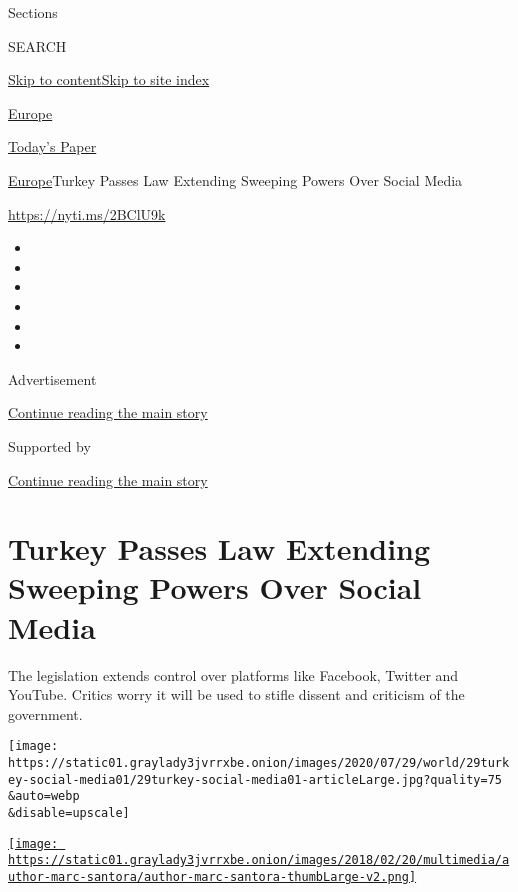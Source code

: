 Sections

SEARCH

\protect\hyperlink{site-content}{Skip to
content}\protect\hyperlink{site-index}{Skip to site index}

\href{https://www.nytimes3xbfgragh.onion/section/world/europe}{Europe}

\href{https://myaccount.nytimes3xbfgragh.onion/auth/login?response_type=cookie\&client_id=vi}{}

\href{https://www.nytimes3xbfgragh.onion/section/todayspaper}{Today's
Paper}

\href{/section/world/europe}{Europe}\textbar{}Turkey Passes Law
Extending Sweeping Powers Over Social Media

\url{https://nyti.ms/2BClU9k}

\begin{itemize}
\item
\item
\item
\item
\item
\item
\end{itemize}

Advertisement

\protect\hyperlink{after-top}{Continue reading the main story}

Supported by

\protect\hyperlink{after-sponsor}{Continue reading the main story}

\hypertarget{turkey-passes-law-extending-sweeping-powers-over-social-media}{%
\section{Turkey Passes Law Extending Sweeping Powers Over Social
Media}\label{turkey-passes-law-extending-sweeping-powers-over-social-media}}

The legislation extends control over platforms like Facebook, Twitter
and YouTube. Critics worry it will be used to stifle dissent and
criticism of the government.

\texttt{[image: https://static01.graylady3jvrrxbe.onion/images/2020/07/29/world/29turkey-social-media01/29turkey-social-media01-articleLarge.jpg?quality=75\\\&auto=webp\\\&disable=upscale]}

\href{https://www.nytimes3xbfgragh.onion/by/marc-santora}{\texttt{[image: https://static01.graylady3jvrrxbe.onion/images/2018/02/20/multimedia/author-marc-santora/author-marc-santora-thumbLarge-v2.png]}}

